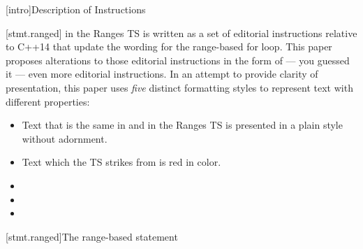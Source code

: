 
[intro]{Description of Instructions}

[stmt.ranged] in the Ranges TS is written as a set of editorial instructions
relative to C++14 that update the wording for the range-based for loop.
This paper proposes alterations to those editorial instructions in the form of
--- you guessed it --- even more editorial instructions. In an attempt to provide
clarity of presentation, this paper uses \emph{five} distinct formatting styles
to represent text with different properties:
\begin{itemize}
\item Text that is the same in  and in the Ranges TS is presented in a
plain style without adornment.

\item {\color{remclr} Text which the TS strikes from  is red in color.}

\item {}

\item {}

\item {}
\end{itemize}

\setcounter{chapter}{5}
\setcounter{section}{1}

[stmt.ranged]{The range-based  statement}


